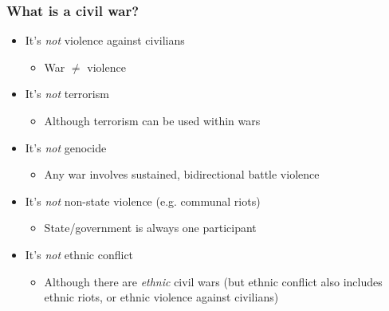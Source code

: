 \documentclass[aspectratio=43]{beamer}
\begin{document}
\begin{frame}
\frametitle{What is  a civil war?}
\centering

\begin{itemize}
  \item<1> It's \textit{not} violence against civilians
  \begin{itemize}
    \item War $\neq$ violence
  \end{itemize}
  \item<2> It's \textit{not} terrorism
  \begin{itemize}
    \item Although terrorism can be used within wars
  \end{itemize}
  \item<3> It's \textit{not} genocide
  \begin{itemize}
    \item Any war involves sustained, bidirectional battle violence
  \end{itemize}
  \item<4> It's \textit{not} non-state violence (e.g. communal riots)
  \begin{itemize}
    \item State/government is always one participant
  \end{itemize}
  \item<5> It's \textit{not} ethnic conflict
  \begin{itemize}
    \item Although there are \textit{ethnic} civil wars (but ethnic conflict also includes ethnic riots, or ethnic violence against civilians)
  \end{itemize}
\end{itemize}

\end{frame}
\end{document}
